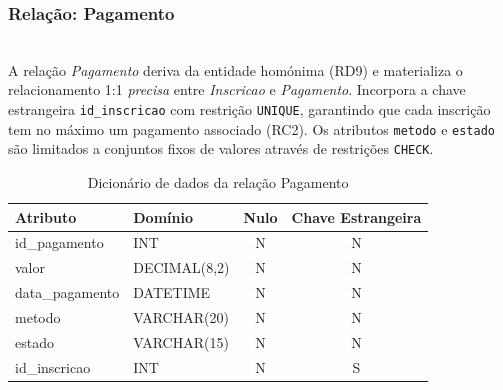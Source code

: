 \documentclass[runningheads]{llncs}
\begin{document}
                \vspace{0.3cm}
                \noindent\begin{minipage}{\textwidth}
                \subsubsection{Relação: Pagamento}\mbox{}\\

                A relação \textit{Pagamento} deriva da entidade homónima (RD9) e materializa o
                relacionamento 1:1 \textit{precisa} entre \textit{Inscricao} e
                \textit{Pagamento}. Incorpora a chave estrangeira \texttt{id\_inscricao} com
                restrição \texttt{UNIQUE}, garantindo que cada inscrição tem no máximo um
                pagamento associado (RC2). Os atributos \texttt{metodo} e \texttt{estado}
                são limitados a conjuntos fixos de valores através de restrições \texttt{CHECK}.

                \begin{table}[H]
                \centering
                \renewcommand{\arraystretch}{1.4}
                \begin{tabular}{|l|l|c|c|}
                \hline
                \textbf{Atributo} & \textbf{Domínio} & \textbf{Nulo} & \textbf{Chave Estrangeira} \\ \hline
                id\_pagamento   & INT           & N & N \\ \hline
                valor           & DECIMAL(8,2)  & N & N \\ \hline
                data\_pagamento & DATETIME      & N & N \\ \hline
                metodo          & VARCHAR(20)   & N & N \\ \hline
                estado          & VARCHAR(15)   & N & N \\ \hline
                id\_inscricao   & INT           & N & S \\ \hline
                \end{tabular}
                \vspace{0.2cm}
                \caption{Dicionário de dados da relação Pagamento}
                \label{tab:dic_pagamento}
                \end{table}
                \end{minipage}
\end{document}
